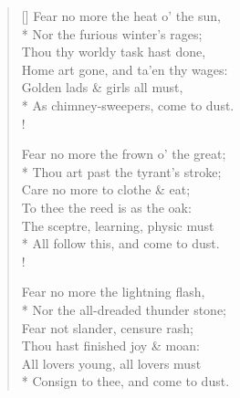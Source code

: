 \documentclass[MAIN]{subfiles}
\begin{document}
\settowidth{\versewidth}{Fear no more the heat o' the sun,}
\begin{verse}[\versewidth]
Fear no more the heat o' the sun,\\*
\vin Nor the furious winter's rages;\\
Thou thy worldy task hast done,\\
\vin Home art gone, and ta'en thy wages:\\
Golden lads \& girls all must,\\*
As chimney-sweepers, come to dust.\\!

Fear no more the frown o' the great;\\*
\vin Thou art past the tyrant's stroke;\\
Care no more to clothe \& eat;\\
\vin To thee the reed is as the oak:\\
The sceptre, learning, physic must\\*
All follow this, and come to dust.\\!

Fear no more the lightning flash,\\*
\vin Nor the all-dreaded thunder stone;\\
Fear not slander, censure rash;\\
\vin Thou hast finished joy \& moan:\\
All lovers young, all lovers must\\*
Consign to thee, and come to dust.
\end{verse}
\end{document}
